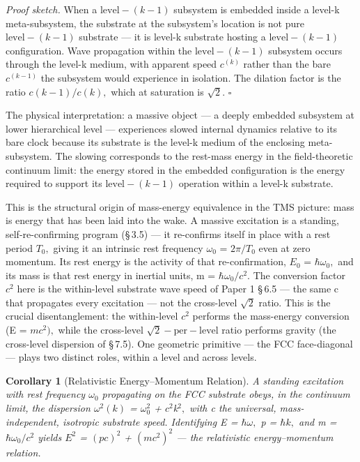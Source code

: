 \documentclass[11pt,oneside]{report}
\newtheorem{corollary}[theorem]{Corollary}
\theoremstyle{definition}
\theoremstyle{remark}
\begin{document}
\emph{Proof sketch.} When a \ensuremath{\text{level}-(k-1)} subsystem is embedded inside a
level-k meta-subsystem, the substrate at the subsystem's location is not
pure \ensuremath{\text{level}-(k-1)} substrate --- it is level-k substrate hosting a
\ensuremath{\text{level}-(k-1)} configuration. Wave propagation within the \ensuremath{\text{level}-(k-1)}
subsystem occurs through the level-k medium, with apparent speed
\ensuremath{c^{(k)}} rather than the bare \ensuremath{c^{(k-1)}} the subsystem would experience
in isolation. The dilation factor is the ratio \ensuremath{c(k-1)/c(k),} which at
saturation is \ensuremath{\sqrt{2}.} \hfill\ensuremath{\square}

The physical interpretation: a massive object --- a deeply embedded
subsystem at lower hierarchical level --- experiences slowed internal
dynamics relative to its bare clock because its substrate is the level-k
medium of the enclosing meta-subsystem. The slowing corresponds to the
rest-mass energy in the field-theoretic continuum limit: the energy
stored in the embedded configuration is the energy required to support
its \ensuremath{\text{level}-(k-1)} operation within a level-k substrate.

This is the structural origin of mass-energy equivalence in the TMS
picture: mass is energy that has been laid into the wake. A massive
excitation is a standing, self-re-confirming program (\S\,3.5) --- it
re-confirms itself in place with a rest period \ensuremath{T_{0},} giving it an
intrinsic rest frequency \ensuremath{\omega_{0}} = \ensuremath{2\pi /T_{0}} even at zero momentum. Its rest
energy is the activity of that re-confirmation, \ensuremath{E_{0}} = \ensuremath{\hbar \omega_{0},} and its mass
is that rest energy in inertial units, m = \ensuremath{\hbar \omega_{0}/c^{2}.} The conversion factor
\ensuremath{c^{2}} here is the within-level substrate wave speed of Paper 1 \S\,6.5 --- the
same c that propagates every excitation --- not the cross-level \ensuremath{\sqrt{2}}
ratio. This is the crucial disentanglement: the within-level \ensuremath{c^{2}} performs
the mass-energy conversion (E = \ensuremath{mc^{2}),} while the cross-level \ensuremath{\sqrt{2}-\text{per}-\text{level}}
ratio performs gravity (the cross-level dispersion of \S\,7.5). One
geometric primitive --- the FCC face-diagonal --- plays two distinct
roles, within a level and across levels.

\begin{corollary}[Relativistic Energy--Momentum Relation]
A
standing excitation with rest frequency \ensuremath{\omega_{0}} propagating on the FCC
substrate obeys, in the continuum limit, the dispersion \ensuremath{\omega^{2}(k)} = \ensuremath{\omega^{2}_{0}} +
\ensuremath{c^{2}}\textbar k\textbar\ensuremath{^{2},} with c the universal, mass-independent, isotropic
substrate speed. Identifying E = \ensuremath{\hbar \omega ,} p = \ensuremath{\hbar k,} and m = \ensuremath{\hbar \omega_{0}/c^{2}} yields \ensuremath{E^{2}} =
\ensuremath{(pc)^{2}} + \ensuremath{(mc^{2})^{2}} --- the relativistic energy--momentum relation.
\end{corollary}
\end{document}
